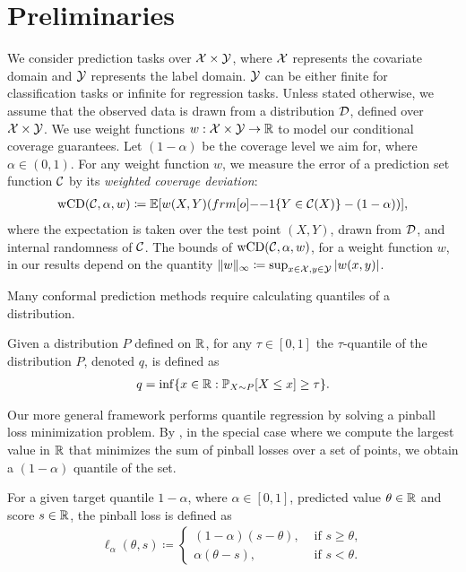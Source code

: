 \section{Preliminaries}

We consider prediction tasks over ${\cal X} \times {\cal Y}$, where ${\cal X}$ represents the covariate domain and ${\cal Y}$ represents the label domain. ${\cal Y}$ can be either finite for classification tasks or infinite for regression tasks. Unless stated otherwise, we assume that the observed data is drawn from a distribution ${\cal D}$, defined over ${\cal X} \times {\cal Y}$.
We use weight functions $w: \cal X\times \cal Y \to \mathbb{R}$ to model our conditional coverage guarantees. 
Let $(1-\alpha)$ be the coverage level we aim for, where $\alpha \in (0,1)$. For any weight function $w$, we measure the error of a prediction set function ${\cal C}$ by its \emph{weighted coverage deviation}: 
\begin{align*}
    \wcovdev(\calC, \alpha, w) \coloneqq \EE[w(X,Y)(\11\{Y \in \calC(X)\}-(1-\alpha))],
\end{align*}
where the expectation is taken over the test point $(X,Y)$, drawn from ${\cal D}$, and internal randomness of ${\cal C}$. The bounds of $\operatorname{wCD}({\cal C}, \alpha, w)$, for a weight function $w$, in our results depend on the quantity 
$\|w\|_{\infty} \coloneqq \sup_{x \in {\cal X}, y \in {\cal Y}} |w(x,y)|$.

Many conformal prediction methods require calculating quantiles of a distribution.

\begin{definition}[Quantile]
    Given a distribution $P$ defined on $\mathbb{R}$, for any $\tau \in [0,1]$ the $\tau$-quantile of the distribution $P$, denoted $q$, is defined as 
    \begin{align*}
        q = \inf\{x \in \mathbb{R}: \mathbb{P}_{X \sim P}[ X \leq x] \geq \tau\}.
    \end{align*}
\end{definition}
Our more general framework performs quantile regression by solving a pinball loss minimization problem. By , in the special case where we compute the largest value in $\mathbb{R}$ that minimizes the sum of pinball losses over a set of points, we obtain a $(1-\alpha)$ quantile of the set.

\begin{definition}
    For a given target quantile $1-\alpha$, where $\alpha \in [0,1]$, predicted value $\theta \in \mathbb{R}$ and score $s \in \mathbb{R}$, the pinball loss is defined as 
    \begin{align*}
        \ell_\alpha(\theta,s) \coloneqq \begin{cases}
            (1-\alpha)(s-\theta), &\text{ if } s \geq \theta,\\
            \alpha(\theta-s), &\text{ if } s<\theta.
        \end{cases}
    \end{align*}
\end{definition}


